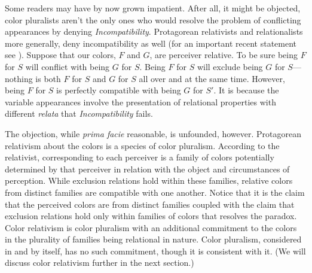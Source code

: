 \documentclass[12pt]{article}
\begin{document}
Some readers may have by now grown impatient. After all, it might be objected, color pluralists aren't the only ones who would resolve the problem of conflicting appearances by denying \emph{Incompatibility}. Protagorean relativists and relationalists more generally, deny incompatibility as well (for an important recent statement see \citealt{Cohen:2009lq}). Suppose that our colors, \( F \) and \( G \), are perceiver relative. To be sure being \( F \) for \( S \) will conflict with being \( G \) for \( S \). Being \( F \) for \( S \) will exclude being \( G \) for \( S \)---nothing is both \( F \) for \( S \) and \( G \) for \( S \) all over and at the same time. However, being \( F \) for \( S \) is perfectly compatible with being \( G \) for \( S' \). It is because the variable appearances involve the presentation of relational properties with different \emph{relata} that \emph{Incompatibility} fails. 

The objection, while \emph{prima facie} reasonable, is unfounded, however. Protagorean relativism about the colors is a species of color pluralism. According to the relativist, corresponding to each perceiver is a family of colors potentially determined by that perceiver in relation with the object and circumstances of perception. While exclusion relations hold within these families, relative colors from distinct families are compatible with one another. Notice that it is the claim that the perceived colors are from distinct families coupled with the claim that exclusion relations hold only within families of colors that resolves the paradox. Color relativism is color pluralism with an additional commitment to the colors in the plurality of families being relational in nature. Color pluralism, considered in and by itself, has no such commitment, though it is consistent with it. (We will discuss color relativism further in the next section.)
\end{document}
